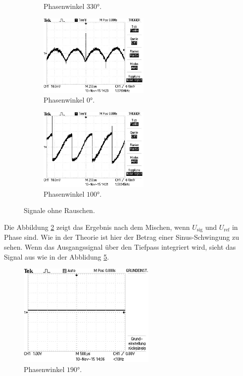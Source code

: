 \begin{figure}
\begin{subfigure}{0.48\textwidth}
    \caption{Phasenwinkel $330°$.}
    \label{fig:orp150}
  \end{subfigure}
  \begin{subfigure}{0.48\textwidth}
    \centering
    \includegraphics[height=4cm]{Bilder/or/or190.JPG}
    \caption{Phasenwinkel $0°$.}
    \label{fig:orp190}
  \end{subfigure}
  \begin{subfigure}{0.48\textwidth}
    \centering
    \includegraphics[height=4cm]{Bilder/or/or280.JPG}
    \caption{Phasenwinkel $100°$.}
    \label{fig:orp280}
  \end{subfigure}
  \caption{Signale ohne Rauschen.}
  \label{fig:Signale ohne Rauschen}
\end{figure}
Die Abbildung \ref{fig:orp190} zeigt das Ergebnis nach dem Mischen, wenn $U_\text{sig}$
und $U_\text{ref}$ in Phase sind. Wie in der Theorie ist hier der Betrag einer Sinus-Schwingung
zu sehen. Wenn das Ausgangssignal über den Tiefpass integriert wird, sieht das
Signal aus wie in der Abblidung \ref{fig:int}.
\begin{figure}
  \centering
  \includegraphics[height=5cm]{Bilder/int/INT.JPG}
  \caption{Phasenwinkel $190°$.}
  \label{fig:int}
\end{figure}
